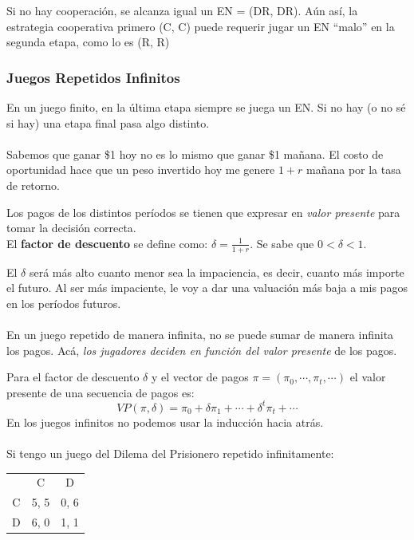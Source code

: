 \documentclass{article}
\begin{document}
                Si no hay cooperación, se alcanza igual un EN = (DR, DR). Aún así, la estrategia cooperativa primero (C, C) puede requerir jugar un EN “malo” en la segunda etapa, como lo es (R, R)
        \subsubsection*{Juegos Repetidos Infinitos}
            En un juego finito, en la última etapa siempre se juega un EN. Si no hay (o no sé si hay) una etapa final pasa algo distinto. \\
            \\
            Sabemos que ganar \$1 hoy no es lo mismo que ganar \$1 mañana. El costo de oportunidad hace que un peso invertido hoy me genere $1+r$ mañana por la tasa de retorno.

            Los pagos de los distintos períodos se tienen que expresar en \emph{valor presente} para tomar la decisión correcta. \\ 
            El \textbf{factor de descuento} se define como: \(\delta = \frac{1}{1+r}\). Se sabe que \(0 < \delta < 1\). 

            El $\delta$ será más alto cuanto menor sea la impaciencia, es decir, cuanto más importe el futuro. Al ser más impaciente, le voy a dar una valuación más baja a mis pagos en los períodos futuros. \\
            \\
            En un juego repetido de manera infinita, no se puede sumar de manera infinita los pagos. Acá, \emph{los jugadores deciden en función del valor presente} de los pagos.

            Para el factor de descuento $\delta$ y el vector de pagos \(\pi = (\pi_{0}, \cdots, \pi_{t}, \cdots)\) el valor presente de una secuencia de pagos es:
            \[VP(\pi, \delta) = \pi_{0} + \delta \pi_{1} + \cdots + \delta^{t}\pi_{t} + \cdots\]
            En los juegos infinitos no podemos usar la inducción hacia atrás. \\
            \\
            Si tengo un juego del Dilema del Prisionero repetido infinitamente:
            \begin{table}[H]
                \centering
                    \begin{tabular}{|c|c|c|}
                          & C    & D    \\
                        C & 5, 5 & 0, 6 \\
                        D & 6, 0 & 1, 1 \\
                    \end{tabular}            
            \end{table}
\end{document}
